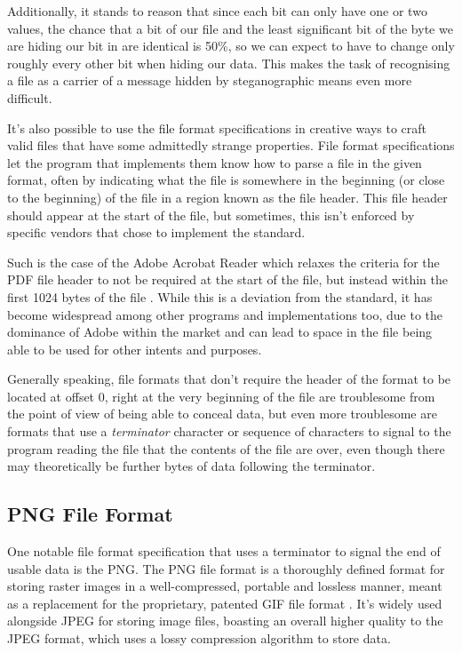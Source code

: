 Additionally, it stands to reason that since each bit can only have one or two values, the chance that a bit of our file 
and the least significant bit of the byte we are hiding our bit in are identical is 50\%, so we can expect to have to
change only roughly every other bit when hiding our data. This makes the task of recognising a file as a carrier of a
message hidden by steganographic means even more difficult.

It's also possible to use the file format specifications in creative ways to craft valid files that have some admittedly
strange properties. File format specifications let the program that implements them know how to parse 
a file in the given format, often by indicating what the file is somewhere in the beginning (or close to the beginning)
of the file in a region known as the file header. This file header should appear at the start of the file, but
sometimes, this isn't enforced by specific vendors that chose to implement the standard. 

Such is the case of the Adobe Acrobat Reader which relaxes the criteria for the \acrfull{PDF} file header to not be
required at the start of the file, but instead within the first 1024 bytes of the file \cite{adobe-acrobat-pdf}. 
While this is a deviation from the standard, it has become widespread among other programs and implementations too, 
due to the dominance of Adobe within the market and can lead to space in the file being able to be used for other 
intents and purposes.

Generally speaking, file formats that don't require the header of the format to be located at offset 0, right at the
very beginning of the file are troublesome from the point of view of being able to conceal data, but even more 
troublesome are formats that use a \emph{terminator} character or sequence of characters to signal to the program reading 
the file that the contents of the file are over, even though there may theoretically be further bytes of data following 
the terminator.

\subsection{\acrfull{PNG} File Format}

One notable file format specification that uses a terminator to signal the end of usable data is the \acrfull{PNG}.
The \acrshort{PNG} file format is a thoroughly defined format for storing raster images in a well-compressed, portable
and lossless manner, meant as a replacement for the proprietary, patented \acrfull{GIF} file format \cite{png-standard}.
It's widely used alongside \acrshort{JPEG} for storing image files, boasting an overall higher quality to the
\acrshort{JPEG} format, which uses a lossy compression algorithm to store data. 


